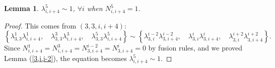 \documentclass{article}
\newtheorem{lemma}{Lemma}[section]
\begin{document}
\begin{lemma}\label{5,i,i+4}
$\lambda_{i,i+4}^5\sim 1$, $\forall i$ when $N_{i,i+4}^5=1$.
\end{lemma}
\begin{proof}
This comes from $(3,3,i,i+4)$:
$$
\left\{\lambda_{3,3}^1\lambda_{i,i+4}^1,\quad
\lambda_{3,3}^3\lambda_{i,i+4}^3,\quad
\lambda_{3,3}^5\lambda_{i,i+4}^5\right\}
\sim
\left\{
\lambda_{3,i}^{i-2}\lambda_{3,i+4}^{i-2},\quad
\lambda_{3,i}^{i}\lambda_{3,i+4}^{i},\quad
\lambda_{3,i}^{i+2}\lambda_{3,i+4}^{i+2}\right\}.
$$
Since $N_{i,i+4}^1=N_{i,i+4}^3=N_{3,i+4}^{i-2}=N_{3,i+4}^{i}=0$ by fusion rules,
and we proved Lemma (\ref{3,i,i-2}),
the equation becomes $\lambda_{i,i+4}^5\sim 1$.
\end{proof}

\end{document}
